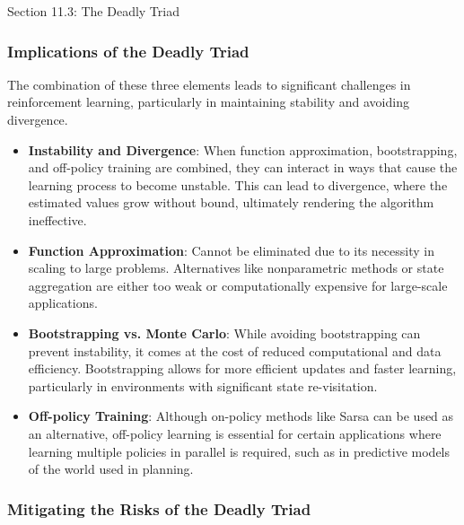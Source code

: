 \begin{notes}{Section 11.3: The Deadly Triad}
\begin{highlight}
    \end{highlight}
    
    \subsubsection*{Implications of the Deadly Triad}
    
    The combination of these three elements leads to significant challenges in reinforcement learning, particularly in maintaining stability and avoiding divergence.
    
    \begin{highlight}
    
        \begin{itemize}
            \item \textbf{Instability and Divergence}: When function approximation, bootstrapping, and off-policy training are combined, they can interact in ways that cause the learning process to become 
            unstable. This can lead to divergence, where the estimated values grow without bound, ultimately rendering the algorithm ineffective.
            \item \textbf{Function Approximation}: Cannot be eliminated due to its necessity in scaling to large problems. Alternatives like nonparametric methods or state aggregation are either too weak 
            or computationally expensive for large-scale applications.
            \item \textbf{Bootstrapping vs. Monte Carlo}: While avoiding bootstrapping can prevent instability, it comes at the cost of reduced computational and data efficiency. Bootstrapping allows for more 
            efficient updates and faster learning, particularly in environments with significant state re-visitation.
            \item \textbf{Off-policy Training}: Although on-policy methods like Sarsa can be used as an alternative, off-policy learning is essential for certain applications where learning multiple policies 
            in parallel is required, such as in predictive models of the world used in planning.
        \end{itemize}
    
    \end{highlight}
    
    \subsubsection*{Mitigating the Risks of the Deadly Triad}
    

\end{notes}
